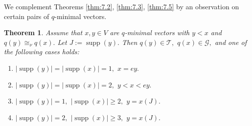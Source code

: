 \documentclass [12pt,a4paper,reqno]{amsart}
\newtheorem{thm}{Theorem} [section]
\begin{document}
We complement Theorems \ref{thm:7.2}, \ref{thm:7.3}, \ref{thm:7.5} by an observation on certain
pairs of $q$-minimal vectors.

\begin{thm}\label{thm:7.6}
Assume that $x,y\in V$ are $q$-minimal vectors with $y<x$ and $q(y)\cong_\nu q(x).$ Let $ J :={\operatorname{supp}} (y).$ Then $q(y)\in {\mathcal T},$ $q(x)\in{\mathcal G},$ and one of the following cases holds:
\begin{enumerate}{\setlength{\itemsep}{2pt}}
\item[1)] $|{\operatorname{supp}} (y)|=|{\operatorname{supp}} (x)|=1,$ $x=ey.$
\item[2)] $|{\operatorname{supp}} (y)|=|{\operatorname{supp}} (x)|=2,$ $y<x<ey.$
\item[3)] $|{\operatorname{supp}} (y)|=1,$ $|{\operatorname{supp}} (x)|\ge 2,$ $y=x( J ).$
\item[4)] $|{\operatorname{supp}} (y)|=2,$ $|{\operatorname{supp}} (x)|\ge 3,$ $y=x( J ).$
\end{enumerate}
\end{thm}
\end{document}
